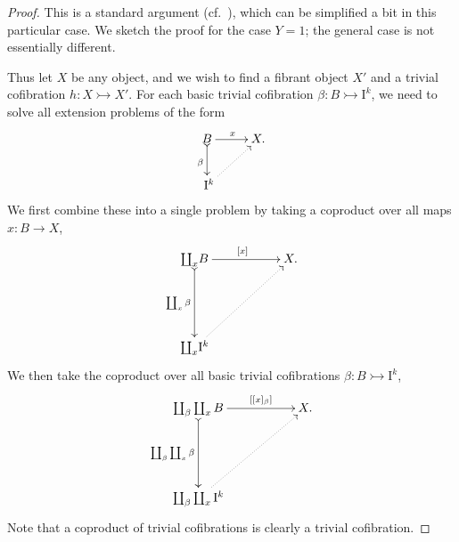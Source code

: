 \documentclass[12pt]{article}
\newcommand{\mono}{\ensuremath{\rightarrowtail}}
\newcommand{\ra}{\ensuremath{\rightarrow}}
\newcommand{\I}{\ensuremath{\mathrm{I}}}
\theoremstyle{remark}
\theoremstyle{definition}
\begin{document}
\begin{proof}
This is a standard argument (cf.~\cite{Quillen,Garner}), which can be simplified a bit in this particular case.  We sketch the proof for the case $Y=1$; the general case is not essentially different.

Thus let $X$ be any object, and we wish to find a fibrant object $X'$ and a trivial cofibration $h : X\mono X'$.
For each basic trivial cofibration $\beta : B\mono \I^{k}$, we need to solve all extension problems of the form
\begin{equation}\label{diagram:extensionforX}
\xymatrix{
B \ar@{>->}[d]_{\beta} \ar[r]^x & X.\\
\ \I^{k} \ar@{..>}[ru]&
}
\end{equation}
We first combine these into a single problem by taking a coproduct over all maps $x : B\ra X$,
\begin{equation*}%
\xymatrix{
{{\coprod_{x}} B} {\ar@{>->}[dd]_-{\coprod_{x}\beta}} {\ar[rr]^{[x]}} && X.\\
&&\\
{{\coprod_{x}} \I^{k}} {\ar@{..>}[rruu]} &&
}
\end{equation*}
%
We then take the coproduct over all basic trivial cofibrations $\beta : B\mono \I^k$,
\begin{equation*}%
\xymatrix{
{\coprod_{\beta}\coprod_{x} B} \ar@{>->}[dd]_-{\coprod_{\beta}\coprod_{x}\beta} {\ar[rr]^-{[[x]_\beta]}} && X.\\
&&\\
{\coprod_{\beta}\coprod_{x} \I^{k}} {\ar@{..>}[rruu]} &&
}
\end{equation*}
Note that a coproduct of trivial cofibrations is clearly a trivial cofibration. 


\end{proof}
\end{document}
